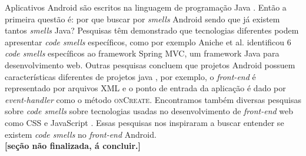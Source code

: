 Aplicativos Android s\~ao escritos na linguagem de programa\c{c}\~ao Java \cite{AndroidFundamentals}. Ent\~ao a primeira quest\~ao \'e: por que buscar por \textit{smells} Android sendo que j\'a existem tantos \textit{smells} Java? Pesquisas t\^em demonstrado que tecnologias diferentes podem apresentar \textit{code smells} espec\'ificos, como por exemplo Aniche et al. identificou 6 \textit{code smells} espec\'ificos ao framework Spring MVC, um framework Java para desenvolvimento web. Outras pesquisas concluem que projetos Android possuem caracter\'isticas diferentes de projetos java \cite{Hecht2015, Mannan_Dig_Ahmed_Jensen_Abdullah_Almurshed, ReimannBrylski2013}, por exemplo, o \textit{front-end} \'e representado por arquivos XML e o ponto de entrada da aplica\c{c}\~ao \'e dado por \textit{event-handler} \cite{AndroidActivities2016} como o m\'etodo \textsc{onCreate}. Encontramos tamb\'em diversas pesquisas sobre \textit{code smells} sobre tecnologias usadas no desenvolvimento de \textit{front-end} web como CSS \cite{CSSCodeSmell} e JavaScript \cite{BB}. Essas pesquisas nos inspiraram a buscar entender se existem \textit{code smells} no \textit{front-end} Android. \\


\textbf{[se\c{c}\~ao n\~ao finalizada, \'a concluir.]}